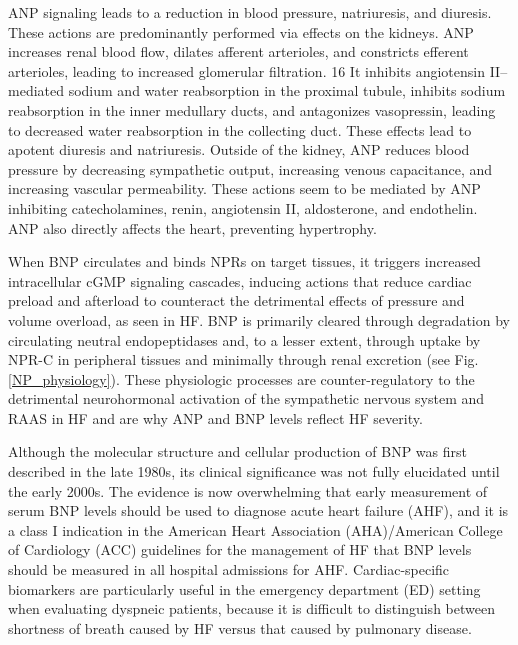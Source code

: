 \documentclass[14pt,a4paper,onecolumn]{extarticle}
\begin{document}
ANP signaling leads to a reduction in blood pressure, natriuresis, and diuresis. These actions are predominantly performed via effects on the kidneys. ANP increases renal blood flow, dilates afferent arterioles, and constricts efferent arterioles, leading to increased glomerular filtration. 16 It inhibits angiotensin II–mediated sodium and water reabsorption in the proximal tubule, inhibits sodium reabsorption in the inner medullary ducts, and antagonizes vasopressin, leading to decreased water reabsorption in the collecting duct. These effects lead to apotent diuresis and natriuresis. Outside of the kidney, ANP reduces blood pressure by decreasing sympathetic output, increasing venous capacitance, and increasing vascular permeability. These actions seem to be mediated by ANP inhibiting catecholamines, renin, angiotensin II, aldosterone, and endothelin. ANP also directly affects the heart, preventing hypertrophy. \citep{Maisel2018} %

When BNP circulates and binds NPRs on target tissues, it triggers increased intracellular cGMP signaling cascades, inducing actions that reduce cardiac preload and afterload to counteract the detrimental effects of pressure and volume overload, as seen in HF. BNP is primarily cleared through degradation by circulating neutral endopeptidases and, to a lesser extent, through uptake by NPR-C in peripheral tissues and minimally through renal excretion (see Fig. \ref{NP_physiology}). These physiologic processes are counter-regulatory to the detrimental neurohormonal activation of the sympathetic nervous system and RAAS in HF and are why ANP and BNP levels reflect HF severity. \citep{Potter2011} %

Although the molecular structure and cellular production of BNP was first described in the late 1980s, its clinical significance was not fully elucidated until the early 2000s. The evidence is now overwhelming that early measurement of serum BNP levels should be used to diagnose acute heart failure (AHF), and it is a class I indication in the American Heart Association (AHA)/American College of Cardiology (ACC) guidelines for the management of HF that BNP levels should be measured in all hospital admissions for AHF. Cardiac-specific biomarkers are particularly useful in the emergency department (ED) setting when evaluating dyspneic patients, because it is difficult to distinguish between shortness of breath caused by HF versus that caused by pulmonary disease. \citep{Maisel2018} %
\end{document}
